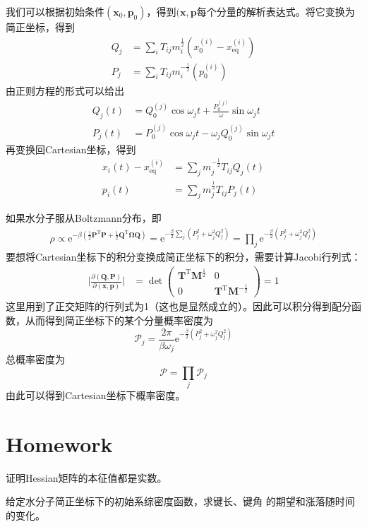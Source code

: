     我们可以根据初始条件$(\bm{x}_0,\bm{p}_0)$，得到$(\bm{x},\bm{p}$每个分量的解析表达式。将它变换为简正坐标，得到
    \begin{align*}
        Q_j &= \sum_i T_{ij} m_i^{\frac 12} (x_0^{(i)} - x_\mathrm{eq}^{(i)})\\
        P_j &= \sum_i T_{ij} m_i^{-\frac 12} (p_0^{(i)})
    \end{align*}
    由正则方程的形式可以给出
    \begin{align*}
        Q_j(t) &= Q_0^{(j)}\cos{\omega_j t} + \frac {P_0^{(j)}}{\omega} \sin{\omega_j t}\\
        P_j(t) &= P_0^{(j)}\cos{\omega_j t} - \omega_j Q_0^{(j)} \sin{\omega_j t}
    \end{align*}
    再变换回Cartesian坐标，得到
    \begin{align*}
        x_i(t) - x_\mathrm{eq}^{(i)} &= \sum_j m_j^{-\frac 12} T_{ij} Q_j(t)\\
        p_i(t) &= \sum_j m_j^{\frac 12} T_{ij}P_j(t)
    \end{align*}

    如果水分子服从Boltzmann分布，即
    \begin{align*}
        \rho \propto \mathrm{e}^{-\beta (\frac 12 \bm{P}^\mathrm{T}\bm{P} + \frac 12 \bm{Q}^\mathrm{T} \bm{\Omega Q})} = \mathrm{e}^{- \frac {\beta}2 \sum_j (P_j^2 + \omega_j^2 Q_j^2)} = \prod_j \mathrm{e}^{-\frac {\beta}2 (P_j^2 + \omega_j^2 Q_j^2)}
    \end{align*}
    要想将Cartesian坐标下的积分变换成简正坐标下的积分，需要计算Jacobi行列式：
    \begin{align*}
        \bigg|\frac {\partial (\bm{Q,P})}{\partial (\bm{x,p})}\bigg| &= \det
        \begin{pmatrix}
            \bm{T}^\mathrm{T}\bm{M}^{\frac 12} & 0\\
            0 & \bm{T}^\mathrm{T}\bm{M}^{-\frac 12}
        \end{pmatrix}
        = 1
    \end{align*}
    这里用到了正交矩阵的行列式为1（这也是显然成立的）。因此可以积分得到配分函数，从而得到简正坐标下的某个分量概率密度为
    \begin{equation*}
        \mathcal{P}_j = \frac {2\pi}{\beta\omega_j} \mathrm{e}^{-\frac {\beta}2 (P_j^2 + \omega_j^2 Q_j^2)}
    \end{equation*}
    总概率密度为
    \begin{equation*}
        \mathcal{P} = \prod_j \mathcal{P}_j
    \end{equation*}
    由此可以得到Cartesian坐标下概率密度。

    \section{Homework}
    \begin{asg}
        证明Hessian矩阵的本征值都是实数。
    \end{asg}
    \begin{asg}
        给定水分子简正坐标下的初始系综密度函数，求键长、键角
        的期望和涨落随时间的变化。
    \end{asg}


    
    

